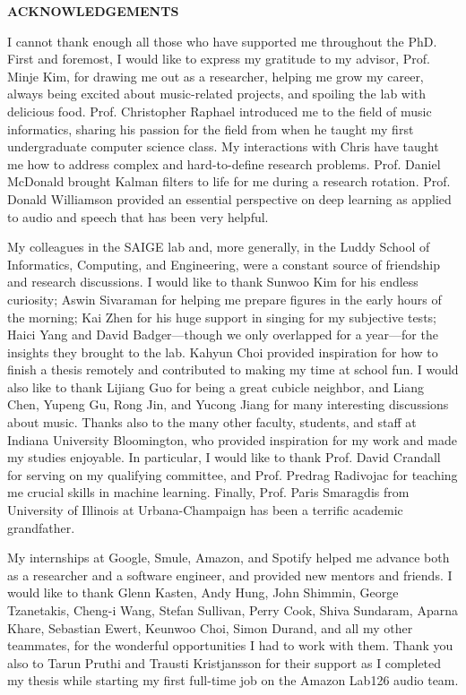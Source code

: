 \begin{centering}
\textbf{ACKNOWLEDGEMENTS}\\
\vspace{\baselineskip}
\end{centering}
I cannot thank enough all those who have supported me throughout the PhD. First and foremost, I would like to express my gratitude to my advisor, Prof. Minje Kim, for drawing me out as a researcher, helping me grow my career, always being excited about music-related projects, and spoiling the lab with delicious food. Prof. Christopher Raphael introduced me to the field of music informatics, sharing his passion for the field from when he taught my first undergraduate computer science class. My interactions with Chris have taught me how to address complex and hard-to-define research problems. Prof. Daniel McDonald brought Kalman filters to life for me during a research rotation. Prof. Donald Williamson provided an essential perspective on deep learning as applied to audio and speech that has been very helpful.

My colleagues in the SAIGE lab and, more generally, in the Luddy School of Informatics, Computing, and Engineering, were a constant source of friendship and research discussions. I would like to thank Sunwoo Kim for his endless curiosity; Aswin Sivaraman for helping me prepare figures in the early hours of the morning; Kai Zhen for his huge support in singing for my subjective tests; Haici Yang and David Badger---though we only overlapped for a year---for the insights they brought to the lab. Kahyun Choi provided inspiration for how to finish a thesis remotely and contributed to making my time at school fun. I would also like to thank Lijiang Guo for being a great cubicle neighbor, and Liang Chen, Yupeng Gu, Rong Jin, and Yucong Jiang for many interesting discussions about music. Thanks also to the many other faculty, students, and staff at Indiana University Bloomington, who provided inspiration for my work and made my studies enjoyable. In particular, I would like to thank Prof. David Crandall for serving on my qualifying committee, and Prof. Predrag Radivojac for teaching me crucial skills in machine learning. Finally, Prof. Paris Smaragdis from University of Illinois at Urbana-Champaign has been a terrific academic grandfather. 

My internships at Google, Smule, Amazon, and Spotify helped me advance both as a researcher and a software engineer, and provided new mentors and friends. I would like to thank Glenn Kasten, Andy Hung, John Shimmin, George Tzanetakis, Cheng-i Wang, Stefan Sullivan, Perry Cook, Shiva Sundaram, Aparna Khare, Sebastian Ewert, Keunwoo Choi, Simon Durand, and all my other teammates, for the wonderful opportunities I had to work with them. Thank you also to Tarun Pruthi and Trausti Kristjansson for their support as I completed my thesis while starting my first full-time job on the Amazon Lab126 audio team. 

